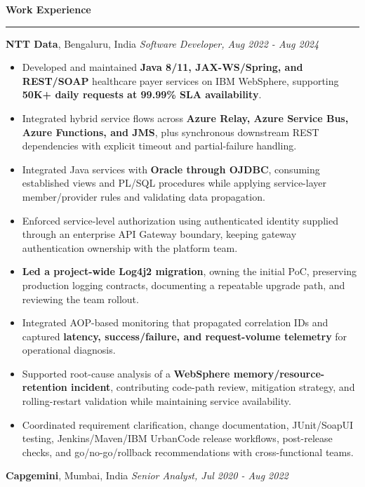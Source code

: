 \documentclass[11pt,letterpaper]{article}
\newcommand{\ressection}[1]{\Needspace{6\baselineskip}\vspace{8pt}\par\textbf{#1}\par\vspace{2pt}\hrule\vspace{5pt}}
\begin{document}
\ressection{Work Experience}
\textbf{NTT Data}, Bengaluru, India \hfill \textit{Software Developer, Aug 2022 - Aug 2024}
\begin{itemize}
  \item Developed and maintained \textbf{Java 8/11, JAX-WS/Spring, and REST/SOAP} healthcare payer services on IBM WebSphere, supporting \textbf{50K+ daily requests at 99.99\% SLA availability}.
  \item Integrated hybrid service flows across \textbf{Azure Relay, Azure Service Bus, Azure Functions, and JMS}, plus synchronous downstream REST dependencies with explicit timeout and partial-failure handling.
  \item Integrated Java services with \textbf{Oracle through OJDBC}, consuming established views and PL/SQL procedures while applying service-layer member/provider rules and validating data propagation.
  \item Enforced service-level authorization using authenticated identity supplied through an enterprise API Gateway boundary, keeping gateway authentication ownership with the platform team.
  \item \textbf{Led a project-wide Log4j2 migration}, owning the initial PoC, preserving production logging contracts, documenting a repeatable upgrade path, and reviewing the team rollout.
  \item Integrated AOP-based monitoring that propagated correlation IDs and captured \textbf{latency, success/failure, and request-volume telemetry} for operational diagnosis.
  \item Supported root-cause analysis of a \textbf{WebSphere memory/resource-retention incident}, contributing code-path review, mitigation strategy, and rolling-restart validation while maintaining service availability.
  \item Coordinated requirement clarification, change documentation, JUnit/SoapUI testing, Jenkins/Maven/IBM UrbanCode release workflows, post-release checks, and go/no-go/rollback recommendations with cross-functional teams.
\end{itemize}
\textbf{Capgemini}, Mumbai, India \hfill \textit{Senior Analyst, Jul 2020 - Aug 2022}
\end{document}
